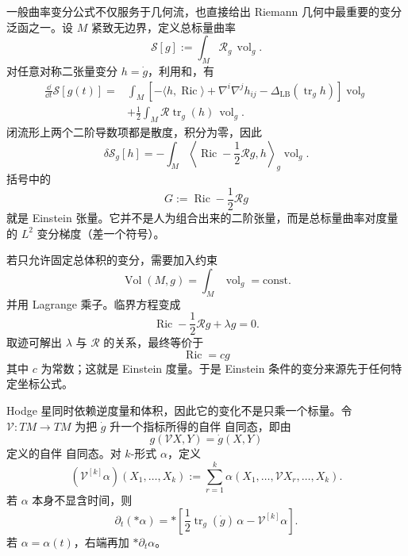 一般曲率变分公式不仅服务于几何流，也直接给出 Riemann 几何中最重要的变分泛函之一。设 $M$ 紧致无边界，定义总标量曲率
\[
\mathcal S[g]
:=\int_M\mathcal R_g\,\operatorname{vol}_g.
\]
对任意对称二张量变分 $h=\dot g$，利用和，有
\[
\begin{aligned}
\frac{\dd}{\dd t}\mathcal S[g(t)]
={}&\int_M
\left[
-\langle h,\operatorname{Ric}\rangle
+\nabla^i\nabla^jh_{ij}
-\Delta_{\mathrm{LB}}(\operatorname{tr}_gh)
\right]\operatorname{vol}_g\\
&+\frac12\int_M
\mathcal R\operatorname{tr}_g(h)\,\operatorname{vol}_g.
\end{aligned}
\]
闭流形上两个二阶导数项都是散度，积分为零，因此
\begin{equation*}{
\delta\mathcal S_g[h]
=-\int_M
\left\langle
\operatorname{Ric}-\frac12\mathcal R g,
h
\right\rangle_g\operatorname{vol}_g
}.\end{equation*}
括号中的
\[
G:=\operatorname{Ric}-\frac12\mathcal R g
\]
就是 Einstein 张量。它并不是人为组合出来的二阶张量，而是总标量曲率对度量的 $L^2$ 变分梯度（差一个符号）。

若只允许固定总体积的变分，需要加入约束
\[
\operatorname{Vol}(M,g)
=\int_M\operatorname{vol}_g=\text{const.}
\]
并用 Lagrange 乘子。临界方程变成
\[
\operatorname{Ric}-\frac12\mathcal R g
+\lambda g=0.
\]
取迹可解出 $\lambda$ 与 $\mathcal R$ 的关系，最终等价于
\begin{equation*}{
\operatorname{Ric}=cg
}\end{equation*}
其中 $c$ 为常数；这就是 Einstein 度量。于是 Einstein 条件的变分来源先于任何特定坐标公式。

Hodge 星同时依赖逆度量和体积，因此它的变化不是只乘一个标量。令 $\mathcal V:TM\to TM$ 为把 $\dot g$ 升一个指标所得的自伴 自同态，即由
\begin{equation*}g(\mathcal V X,Y)=\dot g(X,Y)
\end{equation*}
定义的自伴 自同态。对 $k$-形式 $\alpha$，定义
\[
(\mathcal V^{[k]}\alpha)(X_1,\ldots,X_k)
:=\sum_{r=1}^k
\alpha(X_1,\ldots,\mathcal V X_r,\ldots,X_k).
\]
若 $\alpha$ 本身不显含时间，则
\begin{equation}\label{eq:math-dg-hodge-star-variation}
{
\partial_t(*\alpha)
=*
\left[
\frac12\operatorname{tr}_g(\dot g)\,\alpha
-\mathcal V^{[k]}\alpha
\right].}
\end{equation}
若 $\alpha=\alpha(t)$，右端再加 $*\partial_t\alpha$。



